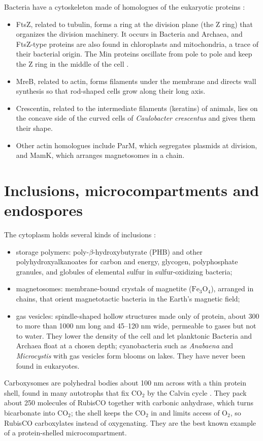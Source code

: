 Bacteria have a cytoskeleton made of
homologues of the eukaryotic proteins
\cite[Sections 5.2--5.3]{madigan2012brock}
\cite{wickstead2011evolution}:
\begin{itemize}
\item FtsZ, related to tubulin, forms a ring
at the division plane (the Z ring) that
organizes the division machinery. It occurs
in Bacteria and Archaea, and FtsZ-type
proteins are also found in chloroplasts and
mitochondria, a trace of their bacterial
origin. The Min proteins oscillate from pole
to pole and keep the Z ring in the middle of
the cell \cite[Chapter
6]{willey2008prescott}.
\item MreB, related to actin, forms filaments
under the membrane and directs wall synthesis
so that rod-shaped cells grow along their
long axis.
\item Crescentin, related to the intermediate
filaments (keratins) of animals, lies on the
concave side of the curved cells of
\emph{Caulobacter crescentus} and gives them
their shape.
\item Other actin homologues include ParM,
which segregates plasmids at division, and
MamK, which arranges magnetosomes in a chain.
\end{itemize}

\section{Inclusions, microcompartments and
endospores}
\label{section-inclusions}

The cytoplasm holds several kinds of
inclusions \cite[Sections
3.10--3.11]{madigan2012brock}:
\begin{itemize}
\item storage polymers:
poly-$\beta$-hydroxybutyrate (PHB) and other
polyhydroxyalkanoates for carbon and energy,
glycogen, polyphosphate granules, and
globules of elemental sulfur in
sulfur-oxidizing bacteria;
\item magnetosomes: membrane-bound crystals
of magnetite ($\mathrm{Fe_3O_4}$), arranged
in chains, that orient magnetotactic bacteria
in the Earth's magnetic field;
\item gas vesicles: spindle-shaped hollow
structures made only of protein, about 300 to
more than 1000 nm long and 45--120 nm wide,
permeable to gases but not to water. They
lower the density of the cell and let
planktonic Bacteria and Archaea float at a
chosen depth; cyanobacteria such as
\emph{Anabaena} and \emph{Microcystis} with
gas vesicles form blooms on lakes. They have
never been found in eukaryotes.
\end{itemize}
Carboxysomes are polyhedral bodies about 100
nm across with a thin protein shell, found in
many autotrophs that fix $\mathrm{CO_2}$ by
the Calvin cycle \cite[Section
13.12]{madigan2012brock}. They pack about 250
molecules of RubisCO together with carbonic
anhydrase, which turns bicarbonate into
$\mathrm{CO_2}$; the shell keeps the
$\mathrm{CO_2}$ in and limits access of
$\mathrm{O_2}$, so RubisCO carboxylates
instead of oxygenating. They are the best
known example of a protein-shelled
microcompartment.

